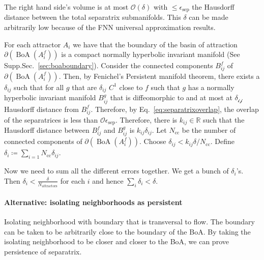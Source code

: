 \documentclass{article}
\theoremstyle{definition}
\theoremstyle{remark}
\newcommand{\reals}{\mathbb{R}}
\newcommand{\cl}{\operatorname{cl}}
\newcommand{\boa}{\operatorname{BoA}}
\newcounter{ct}
\begin{document}
The right hand side's volume is at most $\mathcal{O}(\delta)$ with $\leq\epsilon_{\operatorname{sep}}$ the Hausdorff distance between the total separatrix submanifolds.
This $\delta$ can be made arbitrarily low because of the FNN universal approximation results.

For each attractor $A_i$ we have that the boundary of the basin of attraction $\partial(\boa(A_i^f))$ is a compact normally hyperbolic invariant manifold (See Supp.Sec.~\ref{sec:boaboundary}).
Consider the connected components $B^f_{ij}$ of $\partial(\boa(A_i^f))$.
Then, by Fenichel's Persistent manifold theorem, there exists a $\delta_{ij}$ such that for all $g$ that are $\delta_{ij}$ $C^1$ close to $f$ such that $g$ has a normally hyperbolic invariant manifold  $B^g_{ij}$ that is diffeomorphic to and at most at $\mathcal{\delta_{ij}}$ Hausdorff distance from $B^f_{ij}$.
Therefore, by Eq.~\ref{eq:separatrixoverlap}, the overlap of the separatrices is less than $\mathcal{O}\epsilon_{\operatorname{sep}}$.%
Therefore, there is $k_{ij}\in\reals$ such that the Hausdorff distance between $B^f_{ij}$ and $B^g_{ij}$ is $k_{ij}\delta_{ij}$.
Let  $N_{\operatorname{cc}}$ be the number of connected components of $\partial(\boa(A_i^f))$.
Choose $\delta_{ij}<k_{ij}\delta/N_{\operatorname{cc}}$.%
Define $\delta_i\coloneqq\sum_{i=1}{N_{\operatorname{cc}}}\delta_{ij}$.


Now we need to sum all the different errors together.
We get a bunch of $\delta_i$'s.
Then $\delta_i< \frac{\delta}{N_{\operatorname{attractors}}}$ for each $i$ and hence $\sum_i\delta_i<\delta$.


\paragraph{Alternative: isolating neighborhoods as persistent}
Isolating neighborhood with boundary that is transversal to flow.
The boundary can be taken to be arbitrarily close to the boundary of the BoA.
By taking the isolating neighborhood to be closer and closer to the BoA, we can prove persistence of separatrix.
\end{document}

